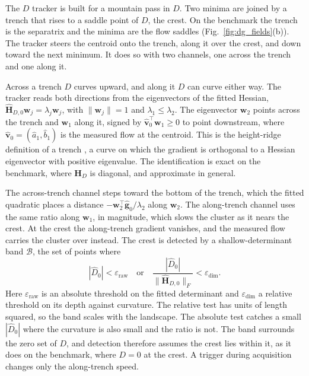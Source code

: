 \documentclass[lettersize,journal]{IEEEtran}
\begin{document}
The $D$ tracker is built for a mountain pass in $D$. Two minima are
joined by a trench that rises to a saddle point of $D$, the crest. On the
benchmark the trench is the separatrix and the minima are the flow saddles
(Fig.~\ref{fig:dg_fields}(b)). The tracker steers the centroid onto the
trench, along it over the crest, and down toward the next minimum. It
does so with two channels, one across the trench and one along it.

Across a trench $D$ curves upward, and along it $D$ can curve either way.
The tracker reads both directions from the eigenvectors of the fitted
Hessian, $\hat{\mathbf{H}}_{D,0}\mathbf{w}_j = \lambda_j \mathbf{w}_j$,
with $\|\mathbf{w}_j\| = 1$ and $\lambda_1 \leq \lambda_2$. The
eigenvector $\mathbf{w}_2$ points across the trench and $\mathbf{w}_1$
along it, signed by $\hat{\mathbf{v}}_0^\top \mathbf{w}_1 \geq 0$ to point
downstream, where $\hat{\mathbf{v}}_0 = (\hat{a}_1, \hat{b}_1)$ is the
measured flow at the centroid. This is the height-ridge definition of a
trench \cite{33}, a curve on which the gradient is orthogonal to a Hessian
eigenvector with positive eigenvalue. The identification is exact on the
benchmark, where $\mathbf{H}_D$ is diagonal, and approximate in general.

The across-trench channel steps toward the bottom of the trench, which
the fitted quadratic places a distance
$-\mathbf{w}_2^\top\hat{\mathbf{g}}_0/\lambda_2$ along $\mathbf{w}_2$. The
along-trench channel uses the same ratio along $\mathbf{w}_1$, in
magnitude, which slows the cluster as it nears the crest.
At the crest the along-trench gradient vanishes, and the measured flow
carries the cluster over instead. The crest is detected by a
shallow-determinant band $\mathcal{B}$, the set of points where
\begin{equation}
    |\hat{D}_0| < \varepsilon_{\mathrm{raw}}
    \quad\text{or}\quad
    \frac{|\hat{D}_0|}{\|\hat{\mathbf{H}}_{D,0}\|_F}
        < \varepsilon_{\dim}.
    \label{eq:band}
\end{equation}
Here $\varepsilon_{\mathrm{raw}}$ is an absolute threshold on the fitted
determinant and $\varepsilon_{\dim}$ a relative threshold on its depth
against curvature. The relative test has units of length squared, so the
band scales with the landscape. The absolute test catches a small
$|\hat{D}_0|$ where the curvature is also small and the ratio is not. The
band surrounds the zero set of $D$, and detection therefore assumes the
crest lies within it, as it does on the benchmark, where $D = 0$ at the
crest. A trigger during acquisition changes only the along-trench speed.
\end{document}
